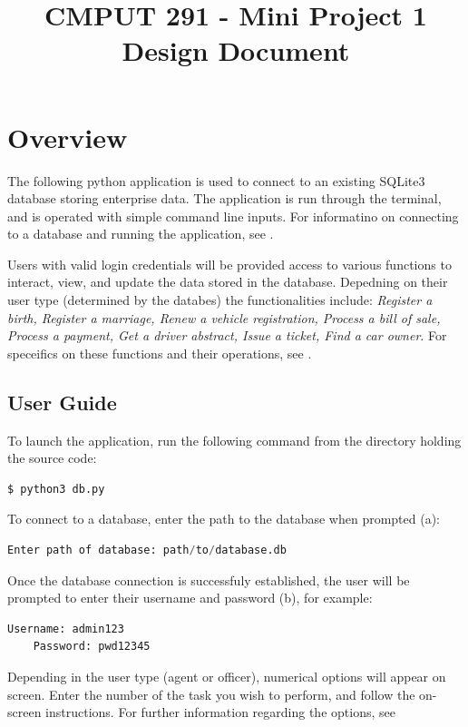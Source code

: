 \documentclass[10pt, a4paper]{article}
\begin{document}
{\selectfont

\title{\vspace{-20mm}CMPUT 291 - Mini Project 1 Design Document}
\date{}
\maketitle
\vspace{-20mm}
\section{Overview}\label{OV}
The following python application is used to connect to an existing SQLite3 database storing enterprise data. The application is run through the terminal, and is operated with simple command line inputs. For informatino on connecting to a database and running the application, see \emph{}.

Users with valid login credentials will be provided access to various functions to interact, view, and update the data stored in the database. Depedning on their user type (determined by the databes) the functionalities include: \emph{Register a birth, Register a marriage, Renew a vehicle registration, Process a bill of sale, Process a payment, Get a driver abstract, Issue a ticket, Find a car owner}. For speceifics on these functions and their operations, see \emph{}.

\subsection{User Guide}\label{UG}
To launch the application, run the following command from the directory holding the source code:
\begin{lstlisting}[language=Python]
	$ python3 db.py
\end{lstlisting}
To connect to a database, enter the path to the database when prompted (a):
\begin{lstlisting}[language=Python]
	Enter path of database: path/to/database.db
\end{lstlisting}
Once the database connection is successfuly established, the user will be prompted to enter their username and password (b), for example:
\begin{lstlisting}[language=Python]		
	Username: admin123
	Password: pwd12345
\end{lstlisting}
Depending in the user type (agent or officer), numerical options will appear on screen. Enter the number of the task you wish to perform, and follow the on-screen instructions. For further information regarding the options, see \emph{}


}
\end{document}
